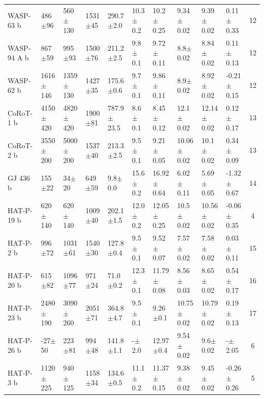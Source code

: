 \begin{subappendices}
{\begin{landscape}
\begin{longtable}{llllllllllc}
  WASP-63 b     &      486$\pm$96 &     560$\pm$130 &   1531$\pm$45 &    290.7$\pm$2.0 &  10.3$\pm$0.2 &   10.2$\pm$0.25 &   9.34$\pm$0.02 &   9.39$\pm$0.02 &   0.11$\pm$0.33 &       12 \\
  WASP-94 A b    &      867$\pm$59 &      995$\pm$93 &   1500$\pm$76 &    211.2$\pm$2.5 &   9.8$\pm$0.1 &   9.72$\pm$0.11 &    8.8$\pm$0.02 &   8.84$\pm$0.02 &   0.11$\pm$0.13 &       12 \\
  WASP-62 b     &    1616$\pm$146 &    1359$\pm$130 &   1427$\pm$35 &    175.6$\pm$0.6 &   9.7$\pm$0.1 &   9.86$\pm$0.11 &    8.9$\pm$0.02 &   8.92$\pm$0.02 &  -0.21$\pm$0.15 &       12 \\
  CoRoT-1 b   &    4150$\pm$420 &    4820$\pm$420 &   1900$\pm$81 &   787.9$\pm$23.5 &   8.6$\pm$0.1 &   8.45$\pm$0.12 &   12.1$\pm$0.02 &  12.14$\pm$0.02 &   0.12$\pm$0.17 &       13 \\
  CoRoT-2 b   &    3550$\pm$200 &    5000$\pm$200 &   1537$\pm$40 &    213.3$\pm$2.5 &   9.5$\pm$0.1 &   9.21$\pm$0.05 &  10.06$\pm$0.02 &   10.1$\pm$0.02 &   0.34$\pm$0.09 &       13 \\
  GJ 436 b    &      155$\pm$22 &       34$\pm$20 &    649$\pm$59 &      9.8$\pm$0.0 &  15.6$\pm$0.2 &  16.92$\pm$0.64 &   6.02$\pm$0.11 &   5.69$\pm$0.05 &  -1.32$\pm$0.67 &       14 \\
  HAT-P-19 b  &     620$\pm$140 &     620$\pm$140 &   1009$\pm$40 &    202.1$\pm$1.5 &  12.0$\pm$0.2 &  12.05$\pm$0.25 &   10.5$\pm$0.02 &  10.56$\pm$0.02 &  -0.06$\pm$0.35 &        4 \\
  HAT-P-2 b   &      996$\pm$72 &     1031$\pm$61 &   1540$\pm$30 &    127.8$\pm$0.4 &   9.5$\pm$0.1 &   9.52$\pm$0.07 &   7.57$\pm$0.02 &   7.58$\pm$0.02 &   0.03$\pm$0.11 &       15 \\
  HAT-P-20 b  &      615$\pm$82 &     1096$\pm$77 &    971$\pm$24 &     71.0$\pm$0.2 &  12.3$\pm$0.1 &  11.79$\pm$0.08 &   8.56$\pm$0.03 &   8.65$\pm$0.02 &   0.54$\pm$0.17 &       16 \\
  HAT-P-23 b  &    2480$\pm$190 &    3090$\pm$260 &   2051$\pm$71 &    364.8$\pm$4.7 &   9.5$\pm$0.1 &    9.26$\pm$0.1 &  10.75$\pm$0.02 &  10.79$\pm$0.02 &   0.19$\pm$0.13 &       17 \\
  HAT-P-26 b  &      -27$\pm$50 &      223$\pm$81 &    994$\pm$48 &    141.8$\pm$1.1 &   -$\pm$2.0 &   12.97$\pm$0.4 &   9.54$\pm$0.02 &    9.6$\pm$0.02 &    -$\pm$2.05 &        6 \\
  HAT-P-3 b   &    1120$\pm$225 &     940$\pm$125 &   1158$\pm$34 &    134.6$\pm$0.5 &  11.1$\pm$0.2 &  11.37$\pm$0.15 &   9.38$\pm$0.02 &   9.45$\pm$0.02 &  -0.26$\pm$0.26 &        5 \\

\end{longtable}
\end{landscape}}
\end{subappendices}
